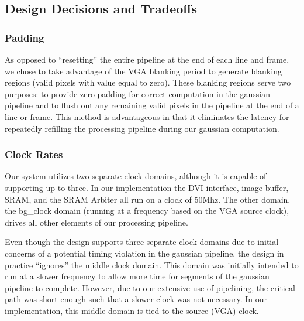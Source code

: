 
\subsection{Design Decisions and Tradeoffs}

\subsubsection{Padding}

As opposed to ``resetting'' the entire pipeline at the end of each line
and frame, we chose to take advantage of the VGA blanking period to generate
blanking regions (valid pixels with value equal to zero). These blanking regions 
serve two purposes: to provide zero
padding for correct computation in the gaussian pipeline and to flush out 
any remaining valid pixels in the pipeline at the end of a line or frame.
This method is advantageous in that it eliminates the latency for
repeatedly refilling the processing pipeline during our gaussian computation.

\subsubsection{Clock Rates}

Our system utilizes two separate clock domains, although it is capable of
supporting up to three. In our implementation the DVI interface, image buffer, 
SRAM, and the SRAM Arbiter all run on a clock of 50Mhz. The other domain, the
bg\_clock domain (running at a frequency based on the VGA source clock), drives
all other elements of our processing pipeline.

Even though the design supports three separate clock domains due to initial concerns
of a potential timing violation in the gaussian pipeline, the design in practice
``ignores'' the middle clock domain. This domain was initially intended to run
at a slower frequency to allow more time for segments of the gaussian pipeline 
to complete. However, due to our extensive use of pipelining, the critical path was
short enough such that a slower clock was not necessary. In our implementation,
this middle domain is tied to the source (VGA) clock.

